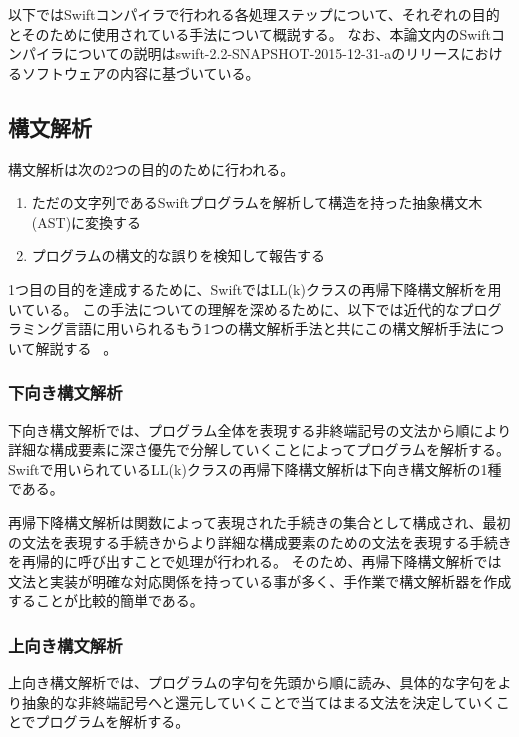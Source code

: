 以下ではSwiftコンパイラで行われる各処理ステップについて、それぞれの目的とそのために使用されている手法について概説する。
なお、本論文内のSwiftコンパイラについての説明はswift-2.2-SNAPSHOT-2015-12-31-aのリリースにおけるソフトウェアの内容に基づいている。

\subsection{構文解析}
\label{refinement:structure:parser}

構文解析は次の2つの目的のために行われる。

\begin{enumerate}
    \item ただの文字列であるSwiftプログラムを解析して構造を持った抽象構文木(AST)に変換する
    \item プログラムの構文的な誤りを検知して報告する
\end{enumerate}

1つ目の目的を達成するために、SwiftではLL(k)クラスの再帰下降構文解析を用いている。
この手法についての理解を深めるために、以下では近代的なプログラミング言語に用いられるもう1つの構文解析手法と共にこの構文解析手法について解説する ~\cite{dragonbook}。

\subsubsection{下向き構文解析}

下向き構文解析では、プログラム全体を表現する非終端記号の文法から順により詳細な構成要素に深さ優先で分解していくことによってプログラムを解析する。
Swiftで用いられているLL(k)クラスの再帰下降構文解析は下向き構文解析の1種である。


再帰下降構文解析は関数によって表現された手続きの集合として構成され、最初の文法を表現する手続きからより詳細な構成要素のための文法を表現する手続きを再帰的に呼び出すことで処理が行われる。
そのため、再帰下降構文解析では文法と実装が明確な対応関係を持っている事が多く、手作業で構文解析器を作成することが比較的簡単である。

\subsubsection{上向き構文解析}

上向き構文解析では、プログラムの字句を先頭から順に読み、具体的な字句をより抽象的な非終端記号へと還元していくことで当てはまる文法を決定していくことでプログラムを解析する。

